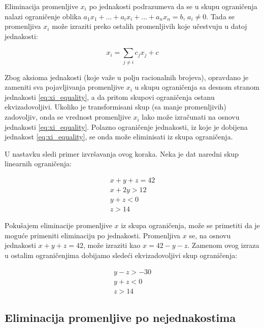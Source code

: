 \documentclass[a4paper,10pt]{article}
\begin{document}
Eliminacija promenljive $x_i$ po jednakosti podrazumeva da se u skupu ograničenja nalazi ograničenje oblika $a_1x_1 + ... + a_ix_i + ... + a_nx_n= b$, $a_i \ne 0$. Tada se promenljiva $x_i$ može izraziti preko ostalih promenljivih koje učestvuju u datoj jednakosti:

\begin{equation}
    \label{eq:xi_equality}
    x_i = \sum_{j \ne i}{c_jx_j + c}
\end{equation}

Zbog aksioma jednakosti (koje važe u polju racionalnih brojeva), opravdano je zameniti sva pojavljivanja promenljive $x_i$ u skupu ograničenja sa desnom stranom jednakosti \eqref{eq:xi_equality}, a da pritom skupovi ograničenja ostanu ekvizadovoljivi. Ukoliko je transformisani skup (sa manje promenljivih) zadovoljiv, onda se vrednost promenljive $x_i$ lako može izračunati na osnovu jednakosti \eqref{eq:xi_equality}. Polazno ograničenje jednakosti, iz koje je dobijena jednakost \eqref{eq:xi_equality}, se onda može eliminisati iz skupa ograničenja.

U nastavku sledi primer izvršavanja ovog koraka. Neka je dat naredni skup linearnih ograničenja:

\begin{equation}
\begin{gathered}
    \label{eq:example_s_1}
    x + y + z = 42 \\
    x + 2y > 12 \\
    y + z < 0 \\
    z > 14
\end{gathered}
\end{equation}

Pokušajem eliminacije promenljive $x$ iz skupa ograničenja, može se primetiti da je moguće primeniti eliminaciju po jednakosti. Promenljiva $x$ se, na osnovu jednakosti $x + y + z = 42$, može izraziti kao $x = 42 - y - z$. Zamenom ovog izraza u ostalim ograničenjima dobijamo sledeći ekvizadovoljivi skup ograničenja:


\begin{equation}
\begin{gathered}
    \label{eq:example_s_2}
    y - z > -30 \\
    y + z < 0 \\
    z > 14
\end{gathered}
\end{equation}

\subsection{Eliminacija promenljive po nejednakostima}
\end{document}
